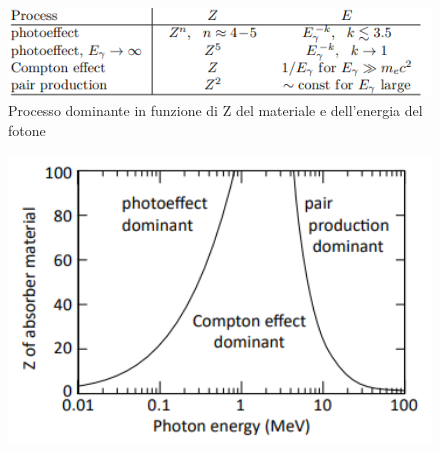 \begin{minipage}{0.48\textwidth}
    \begin{figure}[H]
        \centering
        \includegraphics[width=1\textwidth,frame]{Chapters/images/Interazione_radiazione_materia/tabella.png}
        \captionsetup{width=1\textwidth}
        \caption{Processo dominante in funzione di Z del materiale e dell'energia del fotone}
        \label{fig:recapgamma}
    \end{figure}
\end{minipage} \hfill
\begin{minipage}{0.48\textwidth}
    \begin{figure}[H]
        \centering
        \includegraphics[width=1\textwidth,frame]{Chapters/images/Interazione_radiazione_materia/image-20220220132720070.png}
        \captionsetup{width=1\linewidth}
        \label{fig:}
    \end{figure}


\end{minipage}
